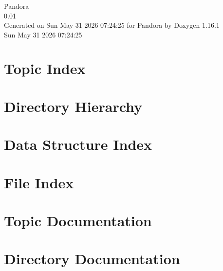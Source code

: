 \documentclass[twoside]{book}
\newcommand{\+}{\discretionary{\mbox{\scriptsize$\hookleftarrow$}}{}{}}
\newcommand{\clearemptydoublepage}{%
    \newpage{\pagestyle{empty}\cleardoublepage}%
  }
\begin{document}
  \raggedbottom
    \hypersetup{pageanchor=false,
                bookmarksnumbered=true,
                pdfencoding=unicode
               }
  \begin{titlepage}
  \vspace*{7cm}
  \begin{center}%
  {\Large Pandora}\\
  [1ex]\large 0.\+01 \\
  \vspace*{1cm}
  {\large Generated on Sun May 31 2026 07:\+24:\+25 for Pandora by Doxygen 1.16.1}\\
    \vspace*{0.5cm}
    {\small Sun May 31 2026 07:24:25}
  \end{center}
  \end{titlepage}
  \clearemptydoublepage
  \tableofcontents
  \clearemptydoublepage
  \hypersetup{pageanchor=true}

\chapter{Topic Index}

\chapter{Directory Hierarchy}

\chapter{Data Structure Index}

\chapter{File Index}

\chapter{Topic Documentation}







\chapter{Directory Documentation}






\end{document}
